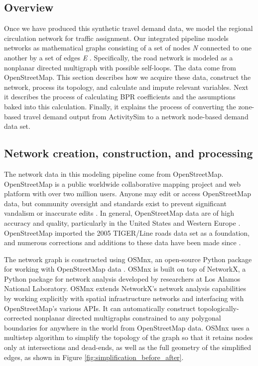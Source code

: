 \subsection{Overview}

Once we have produced this synthetic travel demand data, we model the regional circulation network for traffic assignment. Our integrated pipeline models networks as mathematical graphs consisting of a set of nodes \textit{N} connected to one another by a set of edges \textit{E} \citep{newman_networks:_2010,gastner_spatial_2006}. Specifically, the road network is modeled as a nonplanar directed multigraph with possible self-loops. The data come from OpenStreetMap. This section describes how we acquire these data, construct the network, process its topology, and calculate and impute relevant variables. Next it describes the process of calculating BPR coefficients and the assumptions baked into this calculation. Finally, it explains the process of converting the zone-based travel demand output from ActivitySim to a network node-based demand data set. 

\subsection{Network creation, construction, and processing}

The network data in this modeling pipeline come from OpenStreetMap. OpenStreetMap is a public worldwide collaborative mapping project and web platform with over two million users. Anyone may edit or access OpenStreetMap data, but community oversight and standards exist to prevent significant vandalism or inaccurate edits \citep{jokar_arsanjani_openstreetmap_2015}. In general, OpenStreetMap data are of high accuracy and quality, particularly in the United States and Western Europe \citep{corcoran_analysing_2013,over_generating_2010,haklay_how_2010,maron_how_2015}. OpenStreetMap imported the 2005 TIGER/Line roads data set as a foundation, and numerous corrections and additions to these data have been made since \citep{willis_openstreetmap_2008}.

The network graph is constructed using OSMnx, an open-source Python package for working with OpenStreetMap data \citep{boeing_osmnx:_2017}. OSMnx is built on top of NetworkX, a Python package for network analysis developed by researchers at Los Alamos National Laboratory. OSMnx extends NetworkX's network analysis capabilities by working explicitly with spatial infrastructure networks and interfacing with OpenStreetMap's various APIs. It can automatically construct topologically-corrected nonplanar directed multigraphs constrained to any polygonal boundaries for anywhere in the world from OpenStreetMap data. OSMnx uses a multistep algorithm to simplify the topology of the graph so that it retains nodes only at intersections and dead-ends, as well as the full geometry of the simplified edges, as shown in Figure \ref{fig:simplification_before_after}.

